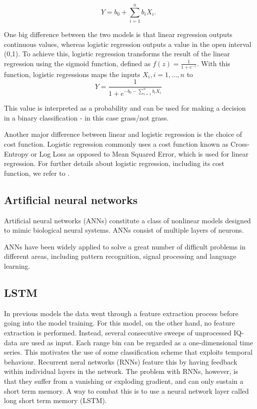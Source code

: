 \begin{equation}
	Y= b_0+\sum_{i=1}^n b_iX_i.
\end{equation}

One big difference between the two models is that linear regression outputs continuous values, whereas logistic regression outputs a value in the open interval (0,1).  To achieve this, logistic regression transforms the result of the linear regression using the sigmoid function, defined as $f(z)=\frac{1}{1+e^{-z}}$. With this function, logistic regressions maps the inputs $X_i, i=1,...,n$ to
\begin{equation}
	Y= \frac{1}{1+e^{-b_0-\sum_{i=1}^n b_iX_i}}
\end{equation}

This value is interpreted as a probability and can be used for making a decision in a binary classification - in this case grass/not grass.

Another major difference between linear and logistic regression is the choice of cost function. Logistic regression commonly uses a cost function known as Cross-Entropy or Log Loss as opposed to Mean Squared Error, which is used for linear regression. For further details about logistic regression, including its cost function, we refer to \citep{a_smola_svn_vishwanathan_2010}.

\subsection*{Artificial neural networks}

Artificial neural networks (ANNs) constitute a class of nonlinear models designed to mimic biological neural systems. ANNs consist of multiple layers of neurons. 


ANNs have been widely applied to solve a great number of difficult problems in different areas, including pattern recognition, signal processing and language learning. 


\subsection*{LSTM}
In previous models the data went through a feature extraction process before going into the model training. For this model, on the other hand, no feature extraction is performed. Instead, several consecutive sweeps of unprocessed IQ-data are used as input. Each range bin can be regarded as a one-dimensional time series. This motivates the use of some classification scheme that exploits temporal behaviour. Recurrent neral networks (RNNs) feature this by having feedback within individual layers in the network. \citep{karim_majumdar_darabi_chen_2018} The problem with RNNs, however, is that they suffer from a vanishing or exploding gradient, and can only sustain a short term memory. A way to combat this is to use a neural network layer called long short term memory (LSTM).


